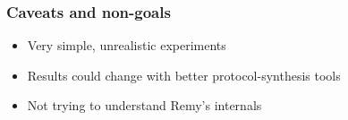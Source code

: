 \begin{frame}
\frametitle{Caveats and non-goals}
\begin{itemize}
\item Very simple, unrealistic experiments
\item Results could change with better protocol-synthesis tools
\item Not trying to understand Remy's internals
\end{itemize}
\end{frame}
